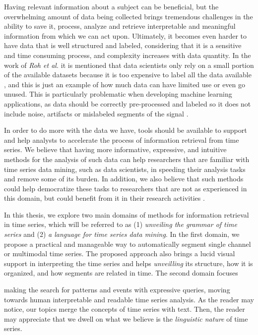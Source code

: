 Having relevant information about a subject can be beneficial, but the overwhelming amount of data being collected brings tremendous challenges in the ability to save it, process, analyze and retrieve interpretable and meaningful information from which we can act upon\cite{bigdata}. Ultimately, it becomes even harder to have data that is well structured and labeled, considering that it is a sensitive and time consuming process, and complexity increases with data quantity. In the work of \textit{Roh et al.} it is mentioned that data scientists only rely on a small portion of the available datasets because it is too expensive to label all the data available \cite{roh2019survey}, and this is just an example of how much data can have limited use or even go unused. This is particularly problematic when developing machine learning applications, as data should be correctly pre-processed and labeled so it does not include noise, artifacts or mislabeled segments of the signal \cite{roh2019survey}.
\par
In order to do more with the data we have, tools should be available to support and help analysts to accelerate the process of information retrieval from time series. We believe that having more informative, expressive, and intuitive methods for the analysis of such data can help researchers that are familiar with time series data mining, such as data scientists, in speeding their analysis tasks and remove some of its burden. In addition, we also believe that such methods could help democratize these tasks to researchers that are not as experienced in this domain, but could benefit from it in their research activities \cite{democratize}.


In this thesis, we explore two main domains of methods for information retrieval in time series, which will be referred to as (1) \textit{unveiling the grammar of time series} and (2) \textit{a language for time series data mining}. In the first domain, we propose a practical and manageable way to automatically segment single channel or multimodal time series. The proposed approach also brings a lucid visual support in interpreting the time series and helps \textit{unveilling} its structure, how it is organized, and how segments are related in time. The second domain focuses 

making the search for patterns and events with expressive queries, moving towards human interpretable and readable time series analysis. As the reader may notice, our topics merge the concepts of time series with text. Then, the reader may appreciate that we dwell on what we believe is the \textit{linguistic nature} of time series.  

